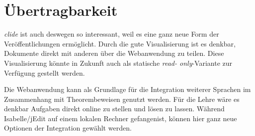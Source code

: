 \section{Übertragbarkeit}

\textit{clide} ist auch deswegen so interessant, weil es eine ganz neue Form der Veröffentlichungen
ermöglicht. Durch die gute Visualisierung ist es denkbar, Dokumente direkt mit anderen über die
Webanwendung zu teilen. Diese Visualisierung könnte in Zukunft auch als statische \textit{read-
only}-Variante zur Verfügung gestellt werden. 

Die Webanwendung kann als Grundlage für die Integration weiterer Sprachen im Zusammenhang mit
Theorembeweisen genutzt werden. Für die Lehre wäre es denkbar Aufgaben direkt online zu stellen
und lösen zu lassen. Während Isabelle/jEdit auf einem lokalen Rechner \glqq gefangen\grqq ist,
können hier ganz neue Optionen der Integration gewählt werden.
